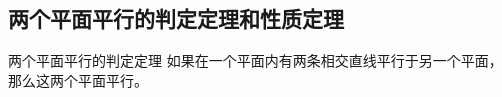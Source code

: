 \subsection{两个平面平行的判定定理和性质定理}
\begin{blk}{两个平面平行的判定定理} 
  如果在一个平面内有两条相交直线平行于另一个平面，那么这两个平面平行。
\end{blk}






\begin{example}
    
\end{example}
\begin{solution}
    
\end{solution}


\begin{example}
    
\end{example}

\begin{solution}
    
\end{solution}

\begin{example}
    
\end{example}
\begin{solution}
    
\end{solution}


\begin{example}
    
\end{example}

\begin{solution}
    
\end{solution}


\begin{example}
    
\end{example}

\begin{solution}
    
\end{solution}



\begin{example}
    
\end{example}

